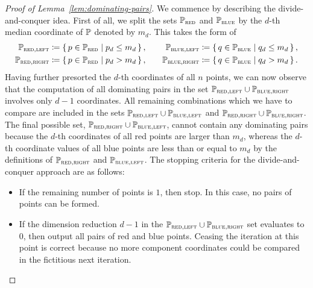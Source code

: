 \begin{proof}[Proof of Lemma~\ref{lem:dominating-pairs}]
    We commence by describing the divide-and-conquer idea.
    First of all, we split the sets $\mathbb{P}_{\textsc{red}}$ and $\mathbb{P}_{\textsc{blue}}$ by the $d$-th median coordinate of $\mathbb{P}$ denoted by $m_d$.
    This takes the form of
    \[
        \begin{split}
            \mathbb{P}_{\textsc{red}, \textsc{left}} &\coloneqq \left\{\,p \in \mathbb{P}_{\textsc{red}}\mid p_d \leq m_d\,\right\}, \\
            \mathbb{P}_{\textsc{red}, \textsc{right}} &\coloneqq \left\{\,p \in \mathbb{P}_{\textsc{red}}\mid p_d > m_d\,\right\},
        \end{split}
        \qquad
        \begin{split}
            \mathbb{P}_{\textsc{blue}, \textsc{left}} &\coloneqq \left\{\,q \in \mathbb{P}_{\textsc{blue}}\mid q_d \leq m_d\,\right\}, \\
            \mathbb{P}_{\textsc{blue}, \textsc{right}} &\coloneqq \left\{\,q \in \mathbb{P}_{\textsc{blue}}\mid q_d > m_d\,\right\}.
        \end{split}
    \]
    Having further presorted the $d$-th coordinates of all $n$ points, we can now observe that the computation of all dominating pairs in the set $\mathbb{P}_{\textsc{red}, \textsc{left}} \cup \mathbb{P}_{\textsc{blue}, \textsc{right}}$ involves only $d - 1$ coordinates.
    All remaining combinations which we have to compare are included in the sets $\mathbb{P}_{\textsc{red}, \textsc{left}} \cup \mathbb{P}_{\textsc{blue}, \textsc{left}}$ and $\mathbb{P}_{\textsc{red}, \textsc{right}} \cup \mathbb{P}_{\textsc{blue}, \textsc{right}}$.
    The final possible set, $\mathbb{P}_{\textsc{red}, \textsc{right}} \cup \mathbb{P}_{\textsc{blue}, \textsc{left}}$, cannot contain any dominating pairs because the $d$-th coordinates of all red points are larger than $m_d$, whereas the $d$-th coordinate values of all blue points are less than or equal to $m_d$ by the definitions of $\mathbb{P}_{\textsc{red}, \textsc{right}}$ and $\mathbb{P}_{\textsc{blue}, \textsc{left}}$.
    The stopping criteria for the divide-and-conquer approach are as follows:
    \begin{itemize}
        \item %
            If the remaining number of points is $1$, then stop.
            In this case, no pairs of points can be formed.
        \item %
            If the dimension reduction $d - 1$ in the $\mathbb{P}_{\textsc{red}, \textsc{left}} \cup \mathbb{P}_{\textsc{blue}, \textsc{right}}$ set evaluates to $0$, then output all pairs of red and blue points.
            Ceasing the iteration at this point is correct because no more component coordinates could be compared in the fictitious next iteration.
    \end{itemize}


\end{proof}
